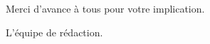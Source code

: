 

\vspace{18pt}

Merci d'avance à tous pour votre implication.

\vspace{18pt}

L'équipe de rédaction.

\vspace{2cm}


  
